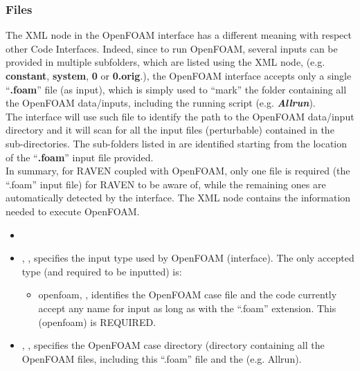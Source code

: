 \subsubsection{Files}
\label{subsub:OpenFOAMfiles}
The  XML node in the OpenFOAM interface has a different meaning with respect other Code Interfaces. Indeed,  since to run OpenFOAM, 
several inputs can be provided in multiple subfolders, which are listed using the  XML node, (e.g. \textbf{constant}, \textbf{system}, \textbf{0} or \textbf{0.orig}.), the OpenFOAM interface accepts
only a single ``\textbf{.foam}'' file (as input), which  is simply used to ``mark'' the folder containing all the OpenFOAM data/inputs, including the running script  (e.g. \textbf{\textit{Allrun}}).
\\The interface will use such file to identify the path to the OpenFOAM data/input directory and it will scan for all the input files (perturbable) contained in the   sub-directories. 
The sub-folders listed in  are identified starting from the location of the ``\textbf{.foam}'' input file provided.
\\In summary, for RAVEN coupled with OpenFOAM, only one file is required (the ``.foam'' input file) for RAVEN to be aware of, while the remaining ones are automatically detected by the interface. 
The   XML node contains the information needed to execute OpenFOAM.

\attrsIntro
%

\begin{itemize}
  \itemsep0em
  \item \nameDescription
  \item {}, , specifies the
  input type used by OpenFOAM (interface). The only accepted type (and required to be inputted) is: 
  \begin{itemize}
    \item openfoam, , identifies the OpenFOAM case file and the code currently accept any name for input as long as with the ``.foam'' extension. This  (openfoam) is REQUIRED.
  \end{itemize}
  \item {}, , specifies the
   OpenFOAM case directory (directory containing all the OpenFOAM files, including this ``.foam'' file and the   (e.g. Allrun).
\end{itemize}

